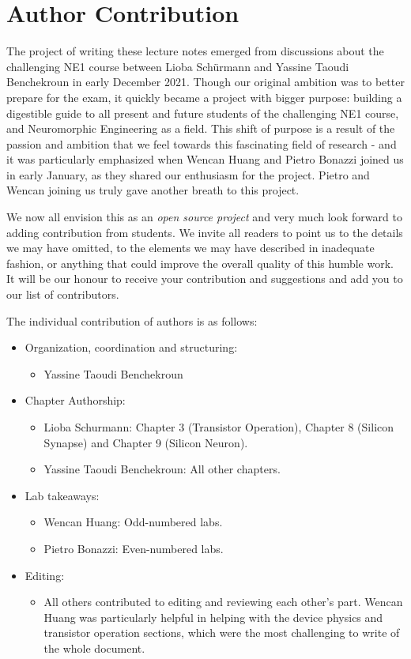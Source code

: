 \section*{Author Contribution}

The project of writing these lecture notes emerged from discussions about the challenging NE1 course between Lioba Schürmann and Yassine Taoudi Benchekroun in early December 2021. Though our original ambition was to better prepare for the exam, it quickly became a project with bigger purpose: building a digestible guide to all present and future students of the challenging NE1 course, and Neuromorphic Engineering as a field. 
This shift of purpose is a result of the passion and ambition that we feel towards this fascinating field of research - and it was particularly emphasized when Wencan Huang and Pietro Bonazzi joined us in early January, as they shared our enthusiasm for the project. Pietro and Wencan joining us truly gave another breath to this project. 

We now all envision this as an \textit{open source project} and very much look forward to adding contribution from students. We invite all readers to point us to the details we may have omitted, to the elements we may have described in inadequate fashion, or anything that could improve the overall quality of this humble work. It will be our honour to receive your contribution and suggestions and add you to our list of contributors. 

The individual contribution of authors is as follows: 

\begin{itemize}
    \item Organization, coordination and structuring: 
    \begin{itemize}
        \item Yassine Taoudi Benchekroun
    \end{itemize}
    \item Chapter Authorship: 
    \begin{itemize}
        \item Lioba Schurmann: Chapter 3 (Transistor Operation), Chapter 8 (Silicon Synapse) and Chapter 9 (Silicon Neuron).
        \item Yassine Taoudi Benchekroun: All other chapters.
    \end{itemize}
    \item Lab takeaways: 
    \begin{itemize}
        \item Wencan Huang: Odd-numbered labs.
        \item Pietro Bonazzi: Even-numbered labs.
    \end{itemize} 
    \item Editing:
    \begin{itemize}
        \item All others contributed to editing and reviewing each other's part. Wencan Huang was particularly helpful in helping with the device physics and transistor operation sections, which were the most challenging to write of the whole document.
    \end{itemize}
\end{itemize}
